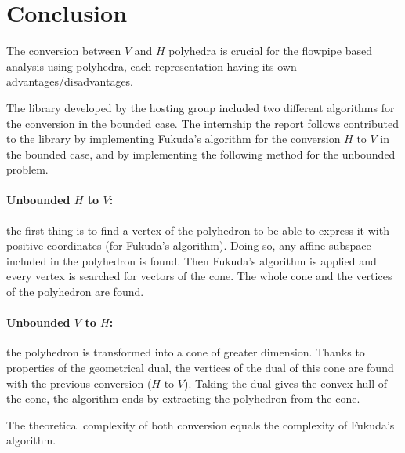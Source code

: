 \section{Conclusion}
\label{section_conclusion}
The conversion between $V$ and $H$ polyhedra is crucial for the flowpipe based analysis using polyhedra, each representation having its own advantages/disadvantages.

The library developed by the hosting group included two different algorithms for the conversion in the bounded case. The internship the report follows contributed to the library by implementing Fukuda's algorithm for the conversion $H$ to $V$ in the bounded case, and by implementing the following method for the unbounded problem.

\paragraph{Unbounded $H$ to $V$:} the first thing is to find a vertex of the polyhedron to be able to express it with positive coordinates (for Fukuda's algorithm). Doing so, any affine subspace included in the polyhedron is found. Then Fukuda's algorithm is applied and every vertex is searched for vectors of the cone. The whole cone and the vertices of the polyhedron are found. 

\paragraph{Unbounded $V$ to $H$:} the polyhedron is transformed into a cone of greater dimension. Thanks to properties of the geometrical dual, the vertices of the dual of this cone are found with the previous conversion ($H$ to $V$). Taking the dual gives the convex hull of the cone, the algorithm ends by extracting the polyhedron from the cone.

The theoretical complexity of both conversion equals the complexity of Fukuda's algorithm.